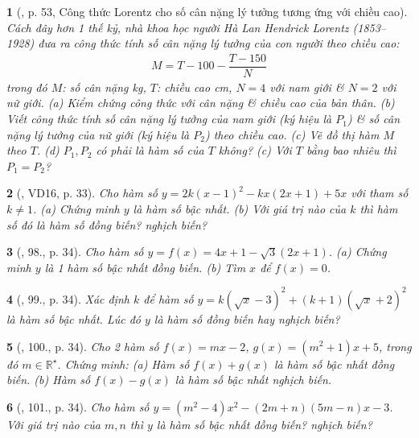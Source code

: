 \documentclass{article}
\newtheorem{baitoan}{}
\begin{document}
\begin{baitoan}[\cite{Binh_boi_duong_Toan_9_tap_1},  p. 53, Công thức Lorentz cho số cân nặng lý tưởng tương ứng với chiều cao]
	Cách đây hơn 1 thế kỷ, nhà khoa học người Hà Lan Hendrick Lorentz (1853--1928) đưa ra công thức tính số cân nặng lý tưởng của con người theo chiều cao:
	\begin{align*}
		\boxed{M = T - 100 - \dfrac{T - 150}{N}}
	\end{align*}
	trong đó $M$: số cân nặng {\rm kg}, $T$: chiều cao {\rm cm}, $N = 4$ với nam giới \& $N = 2$ với nữ giới. (a) Kiểm chứng công thức với cân nặng \& chiều cao của bản thân. (b) Viết công thức tính số cân nặng lý  tưởng của nam giới (ký hiệu là $P_1$) \& số cân nặng lý tưởng của nữ giới (ký hiệu là $P_2$) theo chiều cao. (c) Vẽ đồ thị hàm $M$ theo $T$. (d) $P_1,P_2$ có phải là hàm số của $T$ không? (c) Với $T$ bằng bao nhiêu thì $P_1 = P_2$?
\end{baitoan}

\begin{baitoan}[\cite{Tuyen_Toan_9_old}, VD16, p. 33]
	Cho hàm số $y = 2k(x - 1)^2 - kx(2x + 1) + 5x$ với tham số $k\ne1$. (a) Chứng minh $y$ là hàm số bậc nhất. (b) Với giá trị nào của $k$ thì hàm số đó là hàm số đồng biến? nghịch biến?
\end{baitoan}

\begin{baitoan}[\cite{Tuyen_Toan_9_old}, 98., p. 34]
	Cho hàm số $y = f(x) = 4x + 1 - \sqrt{3}(2x + 1)$. (a) Chứng minh $y$ là 1 hàm số bậc nhất đồng biến. (b) Tìm $x$ để $f(x) = 0$.
\end{baitoan}

\begin{baitoan}[\cite{Tuyen_Toan_9_old}, 99., p. 34]
	Xác định $k$ để hàm số $y = k(\sqrt{x} - 3)^2 + (k + 1)(\sqrt{x} + 2)^2$ là hàm số bậc nhất. Lúc đó $y$ là hàm số đồng biến hay nghịch biến?
\end{baitoan}

\begin{baitoan}[\cite{Tuyen_Toan_9_old}, 100., p. 34]
	Cho 2 hàm số $f(x) = mx - 2$, $g(x) = (m^2 + 1)x + 5$, trong đó $m\in\mathbb{R}^\star$. Chứng minh: (a) Hàm số $f(x) + g(x)$ là hàm số bậc nhất đồng biến. (b) Hàm số $f(x) - g(x)$ là hàm số bậc nhất nghịch biến. 
\end{baitoan}

\begin{baitoan}[\cite{Tuyen_Toan_9_old}, 101., p. 34]
	Cho hàm số $y = (m^2 - 4)x^2 - (2m + n)(5m - n)x - 3$. Với giá trị nào của $m,n$ thì $y$ là hàm số bậc nhất đồng biến? nghịch biến?
\end{baitoan}
\end{document}
